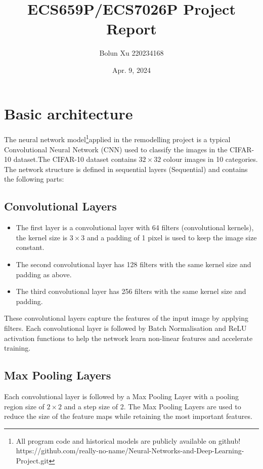 \documentclass[11pt,en]{elegantpaper}
\title{ECS659P/ECS7026P Project Report}
\author{Bolun Xu 220234168}
\date{Apr. 9, 2024}
\begin{document}
\maketitle

\section{Basic architecture}

The neural network model\footnote{All program code and historical models are publicly available on github! https://github.com/really-no-name/Neural-Networks-and-Deep-Learning-Project.git}applied in the remodelling project is a typical Convolutional Neural Network (CNN) used to classify the images in the CIFAR-10 dataset.The CIFAR-10 dataset contains $32\times32$ colour images in 10 categories. The network structure is defined in sequential layers (Sequential) and contains the following parts:

\subsection{Convolutional Layers}

\begin{itemize}
  \item The first layer is a convolutional layer with 64 filters (convolutional kernels), the kernel size is $3\times 3$ and a padding of 1 pixel is used to keep the image size constant.
  \item The second convolutional layer has 128 filters with the same kernel size and padding as above.
  \item The third convolutional layer has 256 filters with the same kernel size and padding.
\end{itemize}
  
These convolutional layers capture the features of the input image by applying filters. Each convolutional layer is followed by Batch Normalisation and ReLU activation functions to help the network learn non-linear features and accelerate training.
    
\subsection{Max Pooling Layers}

Each convolutional layer is followed by a Max Pooling Layer with a pooling region size of $2\times 2$ and a step size of 2. The Max Pooling Layers are used to reduce the size of the feature maps while retaining the most important features.
\end{document}
